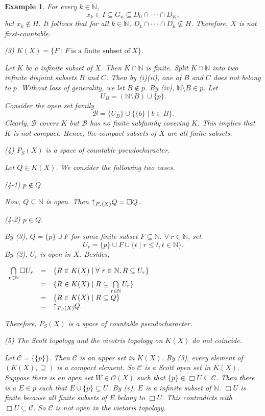 \documentclass[preprint,12pt]{elsarticle}
\numberwithin{equation}{section}
\newtheorem{example}[theorem]{Example}
\newcommand{\up}{\mathord{\uparrow}\hspace{0.05em}}
\begin{document}
\begin{example}
{For every $k\in\mathbb{N}$, $$x_{k}\in I\subseteq G_{n}\subseteq D_{0}\cap\cdot\cdot\cdot\cap D_{K},$$ but $x_{k}\not\in H$. It follows that for all $k\in \mathbb{N}$, $D_{1}\cap\cdot\cdot\cdot\cap D_{k}\not\subseteq H$. Therefore, $X$ is not first-countable.


(3) $K(X)=\{F\mid F\ \mbox{is a finite subset of}\ X\}$.

Let $K$ be a infinite subset of $X$. Then $K\cap\mathbb{N}$ is finite. Split $K\cap\mathbb{N}$ into two infinite disjoint subsets $B$ and $C$. Then by (i)(ii), one of $B$ and $C$ does not belong to $p$. Without loss of generality, we let $B\not\in p$. By (iv), $\mathbb{N}\setminus B\in p$. Let $$U_{B}=(\mathbb{N}\setminus B)\cup\{p\}.$$ Consider the open set family
$$\mathcal{B}=\{U_{B}\}\cup\{\{b\}\mid b\in B\}.$$ Clearly, $\mathcal{B}$ covers $K$ but $\mathcal{B}$ has no finite subfamily covering $K$. This implies that $K$ is not compact. Hence, the compact subsets of $X$ are all finite subsets.

(4) $P_{S}(X)$ is a space of countable pseudocharacter.

Let $Q\in K(X)$. We consider the following two cases.

(4-1) $p\not\in Q$.

Now, $Q\subseteq\mathbb{N}$ is open. Then $\up_{P_{s}(X)}Q=\Box Q$.

(4-2) $p\in Q$.

By (3), $Q=\{p\}\cup F$ for some finite subset $F\subseteq\mathbb{N}$. $\forall\ r\in\mathbb{N}$, set $$U_{r}=\{p\}\cup F\cup\{t\mid r\leq t, t\in\mathbb{N}\}.$$ By (2), $U_{r}$ is open in $X$. Besides,
\begin{center}$\begin{array}{lll}
\bigcap\limits_{r\in\mathbb{N}}\Box U_{r}&=&\{R\in K(X)\mid \forall\ r\in\mathbb{N}, R\subseteq U_{r}\}\\
&=&\{R\in K(X)\mid  R\subseteq \bigcap\limits_{r\in\mathbb{N}}U_{r}\}\\
&=&\{R\in K(X)\mid  R\subseteq Q\}\\
&=&\up_{P_{S}(X)}Q.\\
\end{array}$\end{center}
Therefore, $P_{S}(X)$ is a space of countable pseudocharacter.

(5) The Scott topology and the vieotris topology on $K(X)$ do not coincide.

Let $\mathcal{C}=\{\{p\}\}$. Then $\mathcal{C}$ is an upper set in $K(X)$. By (3), every element of $(K(X),\supseteq)$ is a compact element. So $\mathcal{C}$ is a Scott open set in $K(X)$. Suppose there is an open set $W\in\mathcal{O}(X)$ such that $\{p\}\in \Box U\subseteq\mathcal{C}$. Then there is a $E\in p$ such that $E\cup\{p\}\subseteq U$. By (v), $E$ is a infinite subset of $\mathbb{N}$. $\Box U$ is finite because all finite subsets of $E$ belong to $\Box U$. This contradicts with $\Box U\subseteq\mathcal{C}$. So $\mathcal{C}$ is not open in the vietoris topology.
}
\end{example}
\end{document}

